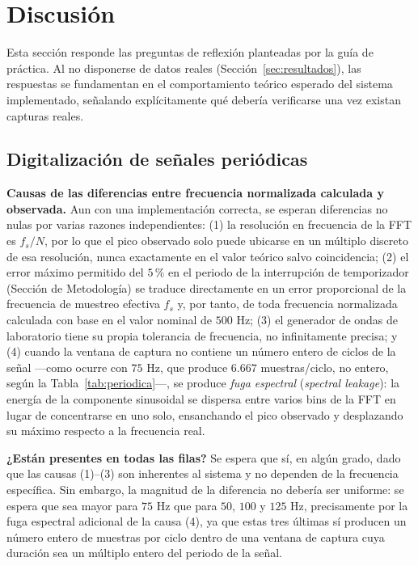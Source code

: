 
\section{Discusión}

Esta sección responde las preguntas de reflexión planteadas por la guía de práctica. Al no disponerse de datos reales (Sección~\ref{sec:resultados}), las respuestas se fundamentan en el comportamiento teórico esperado del sistema implementado, señalando explícitamente qué debería verificarse una vez existan capturas reales.

\subsection{Digitalización de señales periódicas}

\textbf{Causas de las diferencias entre frecuencia normalizada calculada y observada.} Aun con una implementación correcta, se esperan diferencias no nulas por varias razones independientes: (1) la resolución en frecuencia de la FFT es $f_s/N$, por lo que el pico observado solo puede ubicarse en un múltiplo discreto de esa resolución, nunca exactamente en el valor teórico salvo coincidencia; (2) el error máximo permitido del $5\,\%$ en el periodo de la interrupción de temporizador (Sección de Metodología) se traduce directamente en un error proporcional de la frecuencia de muestreo efectiva $f_s$ y, por tanto, de toda frecuencia normalizada calculada con base en el valor nominal de $500$ Hz; (3) el generador de ondas de laboratorio tiene su propia tolerancia de frecuencia, no infinitamente precisa; y (4) cuando la ventana de captura no contiene un número entero de ciclos de la señal —como ocurre con $75$ Hz, que produce $6.667$ muestras/ciclo, no entero, según la Tabla~\ref{tab:periodica}—, se produce \emph{fuga espectral} (\emph{spectral leakage}): la energía de la componente sinusoidal se dispersa entre varios bins de la FFT en lugar de concentrarse en uno solo, ensanchando el pico observado y desplazando su máximo respecto a la frecuencia real.

\textbf{¿Están presentes en todas las filas?} Se espera que sí, en algún grado, dado que las causas (1)–(3) son inherentes al sistema y no dependen de la frecuencia específica. Sin embargo, la magnitud de la diferencia no debería ser uniforme: se espera que sea mayor para $75$ Hz que para $50$, $100$ y $125$ Hz, precisamente por la fuga espectral adicional de la causa (4), ya que estas tres últimas sí producen un número entero de muestras por ciclo dentro de una ventana de captura cuya duración sea un múltiplo entero del periodo de la señal.

